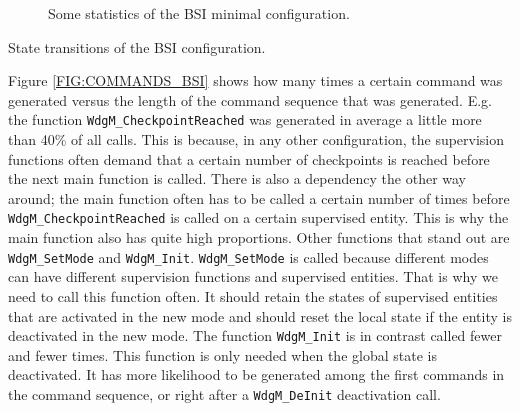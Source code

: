\begin{figure}[!ht]
  \caption{Some statistics of the BSI minimal configuration.}
  \label{FIG:BSI}
\end{figure}

\begin{table}[!ht]
  \caption{State transitions of the BSI configuration.}
  \label{TABLE:STATUSES_BSI}
  
\end{table}

Figure \ref{FIG:COMMANDS_BSI} shows how many times a certain command
was generated versus the length of the command sequence that was
generated. E.g. the function \lstinline!WdgM_CheckpointReached! was
generated in average a little more than 40\% of all calls. This is
because, in any other configuration, the supervision functions often
demand that a certain number of checkpoints is reached before the next
main function is called. There is also a dependency the other way
around; the main function often has to be called a certain number of
times before \lstinline!WdgM_CheckpointReached! is called on a certain
supervised entity. This is why the main function also has quite high
proportions. Other functions that stand out are
\lstinline!WdgM_SetMode! and \lstinline!WdgM_Init!.
\lstinline!WdgM_SetMode! is called because different modes can have
different supervision functions and supervised entities. That is why
we need to call this function often. It should retain the states of
supervised entities that are activated in the new mode and should reset
the local state if the entity is deactivated in the new mode. The
function \lstinline!WdgM_Init! is in contrast called fewer and fewer
times. This function is only needed when the global state is
deactivated. It has more likelihood to be generated among the first
commands in the command sequence, or right after a
\lstinline!WdgM_DeInit! deactivation call.


